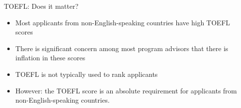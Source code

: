 \begin{frame}[fragile]{TOEFL: Does it matter?}
    \begin{itemize}
        \item Most applicants from non-English-speaking countries have high TOEFL scores
        \item There is significant concern among most program advisors that there is inflation in these scores
        \item TOEFL is \textcolor{red!50!black}{not} typically used to rank applicants
        \item \textcolor{green!40!black}{However:} the TOEFL score is an absolute requirement for applicants from non-English-speaking countries.
    \end{itemize}
\end{frame}

